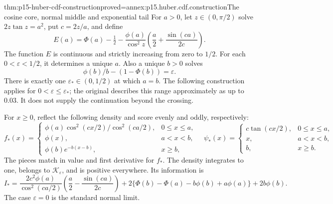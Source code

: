 \begin{hbtheorem}{thm:p15-huber-cdf-construction}{proved=annex:p15.huber.cdf.construction}{The cosine core, normal middle and exponential tail}
For \(a>0\), let \(z\in(0,\pi/2)\) solve \(2z\tan z=a^2\),
put \(c=2z/a\), and define
\[
 E(a)=\Phi(a)-\tfrac12-
       \frac{\phi(a)}{\cos^2z}
         \left(\frac a2+\frac{\sin(ca)}{2c}\right).
\]
The function \(E\) is continuous and strictly increasing from zero
to \(1/2\). For each \(0<\varepsilon<1/2\), it determines a unique
\(a\). Also a unique \(b>0\) solves
\[
                    \phi(b)/b-(1-\Phi(b))=\varepsilon .
\]
There is exactly one \(\varepsilon_*\in(0,1/2)\) at which \(a=b\).
The following construction applies for \(0<\varepsilon\leq\varepsilon_*\);
the original describes this range approximately as up to \(0.03\).
It does not supply the continuation beyond the crossing.

For \(x\geq0\), reflect the following density and score evenly and
oddly, respectively:
\[
 f_*(x)=
 \begin{cases}
 \phi(a)\cos^2(cx/2)/\cos^2(ca/2),&0\leq x\leq a,\\
 \phi(x),&a<x<b,\\
 \phi(b)e^{-b(x-b)},&x\geq b,
 \end{cases}
\quad
 \psi_*(x)=
 \begin{cases}
 c\tan(cx/2),&0\leq x\leq a,\\
 x,&a<x<b,\\
 b,&x\geq b.
 \end{cases}
\]
The pieces match in value and first derivative for \(f_*\).
The density integrates to one, belongs to \(\mathcal K_\varepsilon\),
and is positive everywhere. Its information is
\[
 I_*=
 \frac{2c^2\phi(a)}{\cos^2(ca/2)}
       \left(\frac a2-\frac{\sin(ca)}{2c}\right)
 +2\{\Phi(b)-\Phi(a)-b\phi(b)+a\phi(a)\}
 +2b\phi(b).
\]
The case \(\varepsilon=0\) is the standard normal limit.
\end{hbtheorem}

